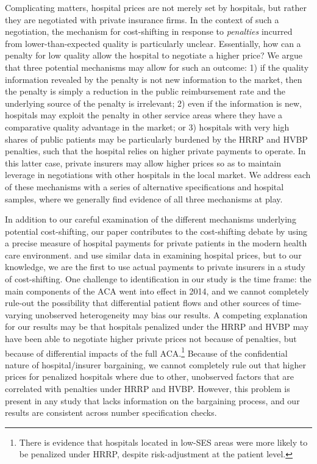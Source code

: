 \documentclass[12pt]{article}
\begin{document}
Complicating matters, hospital prices are not merely set by hospitals, but rather they are negotiated with private insurance firms. In the context of such a negotiation, the mechanism for cost-shifting in response to \textit{penalties} incurred from lower-than-expected quality is particularly unclear. Essentially, how can a penalty for low quality allow the hospital to negotiate a higher price? We argue that three potential mechanisms may allow for such an outcome: 1) if the quality information revealed by the penalty is not new information to the market, then the penalty is simply a reduction in the public reimbursement rate and the underlying source of the penalty is irrelevant; 2) even if the information is new, hospitals may exploit the penalty in other service areas where they have a comparative quality advantage in the market; or 3) hospitals with very high shares of public patients may be particularly burdened by the HRRP and HVBP penalties, such that the hospital relies on higher private payments to operate. In this latter case, private insurers may allow higher prices so as to maintain leverage in negotiations with other hospitals in the local market. We address each of these mechanisms with a series of alternative specifications and hospital samples, where we generally find evidence of all three mechanisms at play.


In addition to our careful examination of the different mechanisms underlying potential cost-shifting, our paper contributes to the cost-shifting debate by using a precise measure of hospital payments for private patients in the modern health care environment. \cite{gowrisankaran2015} and \cite{cooper2015} use similar data in examining hospital prices, but to our knowledge, we are the first to use actual payments to private insurers in a study of cost-shifting.  One challenge to identification in our study is the time frame: the main components of the ACA went into effect in 2014, and we cannot completely rule-out the possibility that differential patient flows and other sources of time-varying unobserved heterogeneity may bias our results.  A competing explanation for our results may be that hospitals penalized under the HRRP and HVBP may have been able to negotiate higher private prices not because of penalties, but because of differential impacts of the full ACA.\footnote{There is evidence that hospitals located in low-SES areas were more likely to be penalized under HRRP, despite risk-adjustment at the patient level.}  Because of the confidential nature of hospital/insurer bargaining, we cannot completely rule out that higher prices for penalized hospitals where due to other, unobserved factors that are correlated with penalties under HRRP and HVBP.  However, this problem is present in any study that lacks information on the bargaining process, and our results are consistent across number specification checks. 
\end{document}
